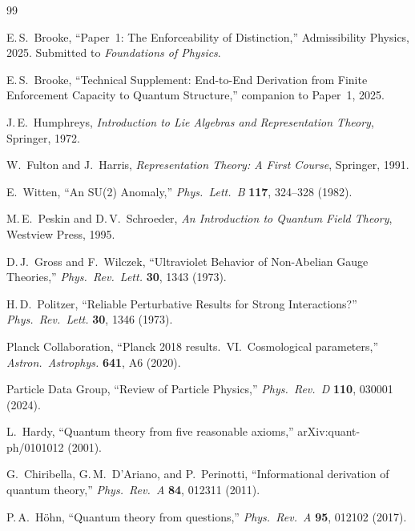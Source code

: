 \documentclass[11pt,a4paper]{article}
\theoremstyle{definition}
\begin{document}

\begin{thebibliography}{99}

E.\,S.~Brooke, ``Paper~1: The Enforceability of Distinction,''
Admissibility Physics, 2025.
Submitted to \textit{Foundations of Physics}.

E.\,S.~Brooke, ``Technical Supplement: End-to-End Derivation from Finite
Enforcement Capacity to Quantum Structure,'' companion to Paper~1, 2025.

J.\,E.~Humphreys, \textit{Introduction to Lie Algebras and Representation
Theory}, Springer, 1972.

W.~Fulton and J.~Harris, \textit{Representation Theory: A First Course},
Springer, 1991.

E.~Witten, ``An SU(2) Anomaly,'' \textit{Phys.\ Lett.\ B} \textbf{117},
324--328 (1982).

M.\,E.~Peskin and D.\,V.~Schroeder, \textit{An Introduction to Quantum
Field Theory}, Westview Press, 1995.

D.\,J.~Gross and F.~Wilczek, ``Ultraviolet Behavior of Non-Abelian
Gauge Theories,'' \textit{Phys.\ Rev.\ Lett.} \textbf{30}, 1343 (1973).

H.\,D.~Politzer, ``Reliable Perturbative Results for Strong Interactions?''
\textit{Phys.\ Rev.\ Lett.} \textbf{30}, 1346 (1973).

Planck Collaboration, ``Planck 2018 results.\ VI.\ Cosmological
parameters,'' \textit{Astron.\ Astrophys.} \textbf{641}, A6 (2020).

Particle Data Group, ``Review of Particle Physics,''
\textit{Phys.\ Rev.\ D} \textbf{110}, 030001 (2024).

L.~Hardy, ``Quantum theory from five reasonable axioms,''
arXiv:quant-ph/0101012 (2001).

G.~Chiribella, G.\,M.~D'Ariano, and P.~Perinotti,
``Informational derivation of quantum theory,''
\textit{Phys.\ Rev.\ A} \textbf{84}, 012311 (2011).

P.\,A.~H\"ohn, ``Quantum theory from questions,''
\textit{Phys.\ Rev.\ A} \textbf{95}, 012102 (2017).


\end{thebibliography}
\end{document}
